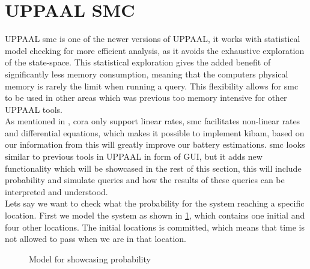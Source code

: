 \section{UPPAAL SMC}\label{sec:smc}
UPPAAL \gls{smc} is one of the newer versions of UPPAAL, it works with statistical model checking for more efficient analysis, as it avoids the exhaustive exploration of the state-space. This statistical exploration gives the added benefit of significantly less memory consumption, meaning that the computers physical memory is rarely the limit when running a query. This flexibility allows for \gls{smc} to be used in other areas which was previous too memory intensive for other UPPAAL tools\cite{cs_smc}. \\
As mentioned in , \gls{cora} only support linear rates, \gls{smc} facilitates non-linear rates and differential equations, which makes it possible to implement \gls{kibam}, based on our information from  this will greatly improve our battery estimations. \gls{smc} looks similar to previous tools in UPPAAL in form of GUI, but it adds new functionality which will be showcased in the rest of this section, this will include probability and simulate queries and how the results of these queries can be interpreted and understood. \\
Lets say we want to check what the probability for the system reaching a specific location. First we model the system as shown in \cref{fig:example}, which contains one initial and four other locations. The initial locations is committed, which means that time is not allowed to pass when we are in that location.

\begin{figure}[H]
	\centering
	\caption{Model for showcasing probability}
	\label{fig:example}
\end{figure}

